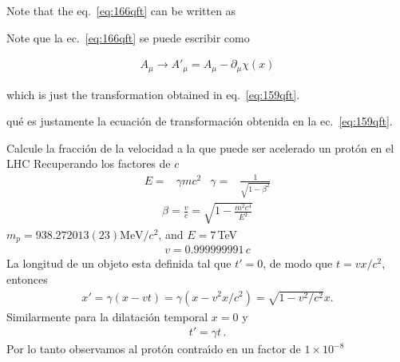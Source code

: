 \begin{english}
Note that the eq.~\eqref{eq:166qft} can be written as  
\end{english}
\begin{spanish}
Note que la ec.~\eqref{eq:166qft} se puede escribir como
\end{spanish}

\begin{align}
\label{eq:168qft}
  A_\mu\to A'_\mu=A_\mu-\partial_\mu\chi(x)
\end{align}
\begin{english}
which is just the transformation obtained in eq.~\eqref{eq:159qft}.  
\end{english}
\begin{spanish} %
qu\'e es justamente la ecuaci\'on de transformaci\'on obtenida en la ec.~\eqref{eq:159qft}.  
\end{spanish}


\begin{example}
  Calcule la fracci\'on de la velocidad a la que puede ser acelerado un prot\'on en el LHC
Recuperando los factores de $c$
  \begin{align*}
  E=&\gamma m c^2&  \gamma=&\frac{1}{\sqrt{1-\beta^2}}
\end{align*}
\begin{align*}
  \beta=\frac{v}{c}=\sqrt{1-\frac{m^2 c^4}{E^2}}
\end{align*}
$m_p=938.272013(23) {\text{MeV}}/{c^2}$, and $E=7\,$TeV
\begin{align*}
  v=0.999999991\,c
\end{align*}
La longitud de un objeto esta definida tal que $t'=0$, de modo que $t=v x/c^2$, entonces
\begin{align}
  x'=\gamma(x-v t)=\gamma(x-v^2 x/c^2)=\sqrt{1-v^2/c^2}x.
\end{align}
Similarmente para la dilataci\'on temporal $x=0$ y
\begin{align}
  t'=\gamma t\,.
\end{align}
Por lo tanto observamos al prot\'on contra\'\i do en un factor de $1\times10^{-8}$
\end{example}


